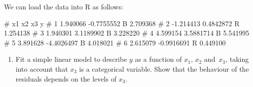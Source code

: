 \documentclass[
  a4paper,
]{article}
\newenvironment{Shaded}{\begin{snugshade}}{\end{snugshade}}
\newcommand{\AttributeTok}[1]{\textcolor[rgb]{0.77,0.63,0.00}{#1}}
\newcommand{\CommentTok}[1]{\textcolor[rgb]{0.56,0.35,0.01}{\textit{#1}}}
\newcommand{\FunctionTok}[1]{\textcolor[rgb]{0.00,0.00,0.00}{#1}}
\newcommand{\NormalTok}[1]{#1}
\newcommand{\OtherTok}[1]{\textcolor[rgb]{0.56,0.35,0.01}{#1}}
\newcommand{\SpecialCharTok}[1]{\textcolor[rgb]{0.00,0.00,0.00}{#1}}
\newcommand{\StringTok}[1]{\textcolor[rgb]{0.31,0.60,0.02}{#1}}
\providecommand{\tightlist}{%
  \setlength{\itemsep}{0pt}\setlength{\parskip}{0pt}}
\theoremstyle{definition}
\theoremstyle{definition}
\theoremstyle{definition}
\theoremstyle{definition}
\theoremstyle{remark}
\begin{document}
\begin{myanswers}

We can load the data into R as follows:

\begin{Shaded}
\end{Shaded}

\begin{Shaded}
\begin{Highlighting}[]
\NormalTok{\#          x1         x2 x3        y}
\NormalTok{\# 1  1.940066 {-}0.7755552  B 2.709368}
\NormalTok{\# 2 {-}1.214413  0.4842872  R 1.254138}
\NormalTok{\# 3  1.940301  3.1189902  B 3.228220}
\NormalTok{\# 4  4.599154  3.5881714  B 5.541995}
\NormalTok{\# 5  3.891628 {-}4.4026497  B 4.018021}
\NormalTok{\# 6  2.615079 {-}0.9916691  R 0.449100}
\end{Highlighting}
\end{Shaded}

\end{myanswers}

\begin{enumerate}
\def\labelenumi{\alph{enumi}.}
\setcounter{enumi}{1}
\tightlist
\item
  Fit a simple linear model to describe \(y\) as a function of \(x_1\), \(x_2\)
  and~\(x_3\), taking into account that \(x_3\) is a categorical variable.
  Show that the behaviour of the residuals depends on the levels of \(x_3\).
\end{enumerate}
\end{document}
